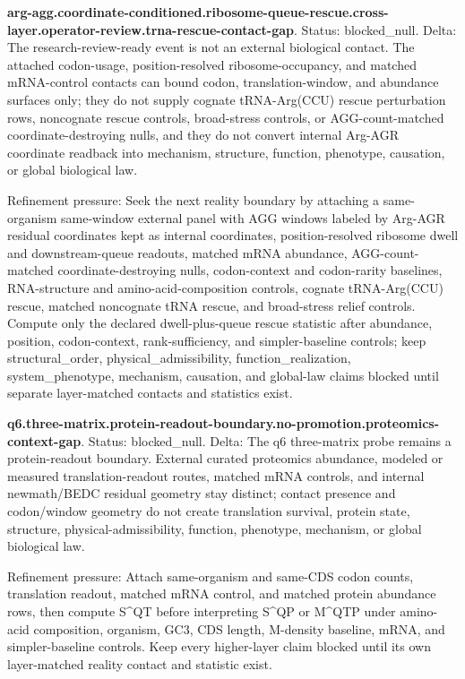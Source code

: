 \textbf{arg-agg.coordinate-conditioned.ribosome-queue-rescue.cross-layer.operator-review.trna-rescue-contact-gap}. Status: blocked\_null. Delta: The research-review-ready event is not an external biological contact. The attached codon-usage, position-resolved ribosome-occupancy, and matched mRNA-control contacts can bound codon, translation-window, and abundance surfaces only; they do not supply cognate tRNA-Arg(CCU) rescue perturbation rows, noncognate rescue controls, broad-stress controls, or AGG-count-matched coordinate-destroying nulls, and they do not convert internal Arg-AGR coordinate readback into mechanism, structure, function, phenotype, causation, or global biological law.

Refinement pressure: Seek the next reality boundary by attaching a same-organism same-window external panel with AGG windows labeled by Arg-AGR residual coordinates kept as internal coordinates, position-resolved ribosome dwell and downstream-queue readouts, matched mRNA abundance, AGG-count-matched coordinate-destroying nulls, codon-context and codon-rarity baselines, RNA-structure and amino-acid-composition controls, cognate tRNA-Arg(CCU) rescue, matched noncognate tRNA rescue, and broad-stress relief controls. Compute only the declared dwell-plus-queue rescue statistic after abundance, position, codon-context, rank-sufficiency, and simpler-baseline controls; keep structural\_order, physical\_admissibility, function\_realization, system\_phenotype, mechanism, causation, and global-law claims blocked until separate layer-matched contacts and statistics exist.

\textbf{q6.three-matrix.protein-readout-boundary.no-promotion.proteomics-context-gap}. Status: blocked\_null. Delta: The q6 three-matrix probe remains a protein-readout boundary. External curated proteomics abundance, modeled or measured translation-readout routes, matched mRNA controls, and internal newmath/BEDC residual geometry stay distinct; contact presence and codon/window geometry do not create translation survival, protein state, structure, physical-admissibility, function, phenotype, mechanism, or global biological law.

Refinement pressure: Attach same-organism and same-CDS codon counts, translation readout, matched mRNA control, and matched protein abundance rows, then compute S\textasciicircum{}QT before interpreting S\textasciicircum{}QP or M\textasciicircum{}QTP under amino-acid composition, organism, GC3, CDS length, M-density baseline, mRNA, and simpler-baseline controls. Keep every higher-layer claim blocked until its own layer-matched reality contact and statistic exist.

